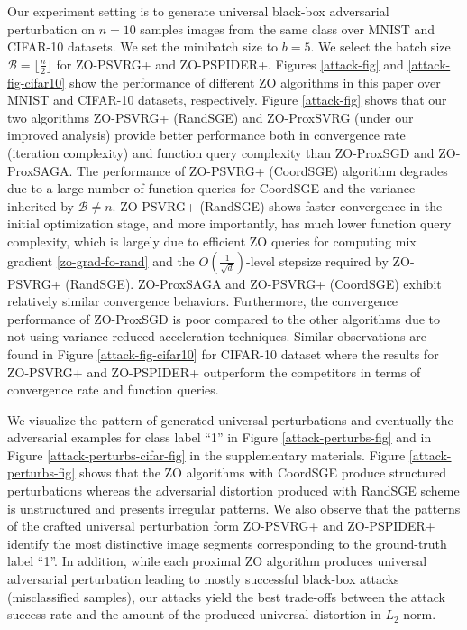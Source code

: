 \documentclass[iicol,sn-basic]{sn-jnl}
\theoremstyle{thmstyleone}%
\theoremstyle{thmstyletwo}%
\theoremstyle{thmstylethree}%
\begin{document}
Our experiment setting is to generate universal black-box adversarial perturbation on $n = 10$ samples images from the same class over MNIST and CIFAR-10 datasets. We set the minibatch size to $b=5$. We select the batch size $\mathcal{B} = \lfloor{\frac{n}{2}}\rfloor$ for ZO-PSVRG+ and ZO-PSPIDER+.
Figures \ref{attack-fig} and \ref{attack-fig-cifar10} show
the performance of different ZO algorithms in this paper over MNIST and CIFAR-10 datasets, respectively. Figure \ref{attack-fig} shows that our two algorithms ZO-PSVRG+ (RandSGE) and ZO-ProxSVRG (under our improved analysis) provide better performance
both in convergence rate (iteration complexity) and function query complexity than ZO-ProxSGD
and ZO-ProxSAGA. The performance of ZO-PSVRG+ (CoordSGE) algorithm degrades due to a large number of function queries for CoordSGE and the variance inherited by $\mathcal{B} \neq n$. 
ZO-PSVRG+ (RandSGE) shows faster convergence in the initial optimization stage, and more importantly, has much lower function query complexity, which is largely
due to efficient ZO queries for computing mix gradient \eqref{zo-grad-fo-rand} and  the $O(\frac{1}{\sqrt{d}})$-level stepsize required by ZO-PSVRG+ (RandSGE). ZO-ProxSAGA and ZO-PSVRG+ (CoordSGE) exhibit relatively similar convergence behaviors. Furthermore, the convergence performance of ZO-ProxSGD is poor compared to the other algorithms due to not using variance-reduced acceleration techniques. Similar observations are found in Figure \ref{attack-fig-cifar10} for CIFAR-10 dataset where the results for ZO-PSVRG+ and ZO-PSPIDER+ outperform the competitors in terms of convergence rate and function queries.

We visualize the pattern of generated universal perturbations and eventually the adversarial examples for class label ``1'' in Figure \ref{attack-perturbs-fig} and in Figure \ref{attack-perturbs-cifar-fig} in the supplementary materials. Figure \ref{attack-perturbs-fig} shows that the ZO algorithms with CoordSGE produce structured perturbations whereas the adversarial distortion produced with RandSGE scheme is unstructured and presents irregular patterns. We also observe that the patterns of the crafted universal perturbation form ZO-PSVRG+ and ZO-PSPIDER+ identify the most distinctive image segments corresponding to the ground-truth label ``1''. In addition, while each proximal ZO algorithm produces universal adversarial perturbation leading to mostly successful black-box attacks (misclassified samples), our attacks yield the best trade-offs between the attack success rate and the amount of the produced universal distortion in $L_2$-norm.
\end{document}
